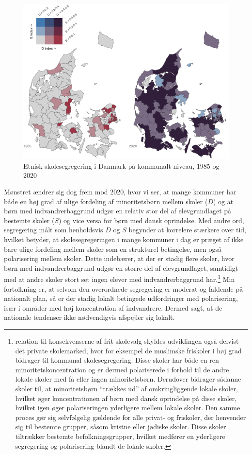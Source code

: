 \documentclass[
]{book}
\begin{document}
\begin{figure}
\includegraphics[width=1\linewidth]{images/Figur4} \caption{Etnisk skolesegregering i Danmark på kommunalt niveau, 1985 og 2020}\label{fig:fig-4-3}
\end{figure}

Mønstret ændrer sig dog frem mod 2020, hvor vi ser, at mange kommuner har både en høj grad af ulige fordeling af minoritetsbørn mellem skoler (\(D\)) og at børn med indvandrerbaggrund udgør en relativ stor del af elevgrundlaget på bestemte skoler (\(S\)) og vice versa for børn med dansk oprindelse. Med andre ord, segregering målt som henholdsvis \(D\) og \(S\) begynder at korrelere stærkere over tid, hvilket betyder, at skolesegregeringen i mange kommuner i dag er præget af ikke bare ulige fordeling mellem skoler som en strukturel betingelse, men også polarisering mellem skoler. Dette indebærer, at der er stadig flere skoler, hvor børn med indvandrerbaggrund udgør en større del af elevgrundlaget, samtidigt med at andre skoler stort set ingen elever med indvandrerbaggrund har.\footnote{relation til konsekvenserne af frit skolevalg skyldes udviklingen også delvist det private skolemarked, hvor for eksempel de muslimske friskoler i høj grad bidrager til kommunal skolesegregering. Disse skoler har både en ren minoritetskoncentration og er dermed polariserede i forhold til de andre lokale skoler med få eller ingen minoritetsbørn. Derudover bidrager sådanne skoler til, at minoritetsbørn ``trækkes ud'' af omkringliggende lokale skoler, hvilket øger koncentrationen af børn med dansk oprindelse på disse skoler, hvilket igen øger polariseringen yderligere mellem lokale skoler. Den samme proces gør sig selvfølgelig gældende for alle privat- og friskoler, der henvender sig til bestemte grupper, såsom kristne eller jødiske skoler. Disse skoler tiltrækker bestemte befolkningsgrupper, hvilket medfører en yderligere segregering og polarisering blandt de lokale skoler.} Min fortolkning er, at selvom den overordnede segregering er moderat og faldende på nationalt plan, så er der stadig lokalt betingede udfordringer med polarisering, især i områder med høj koncentration af indvandrere. Dermed sagt, at de nationale tendenser ikke nødvendigvis afspejler sig lokalt.
\end{document}

